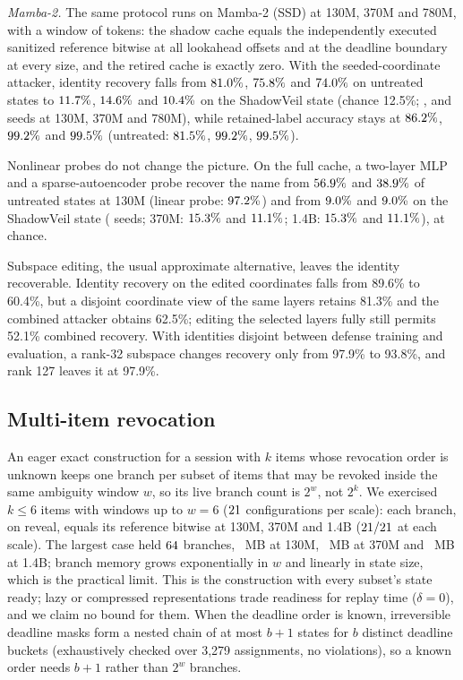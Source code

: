 \documentclass[conference]{IEEEtran}
\begin{document}
\emph{Mamba-2.} The same protocol runs on Mamba-2 (SSD) at 130M, 370M and 780M, with a window of \nMtwoWindowA{} tokens: the shadow cache
equals the independently executed sanitized reference bitwise at all \nMtwoDeltasA{} lookahead offsets and at the deadline boundary at every
size, and the retired cache is exactly zero. With the seeded-coordinate attacker, identity recovery falls from $81.0\%$,
$75.8\%$ and $74.0\%$ on untreated states to $11.7\%$, $14.6\%$ and $10.4\%$ on
the ShadowVeil state (chance 12.5\%; \nMtwoSeedsA, \nMtwoSeedsB{} and \nMtwoSeedsD{} seeds at 130M, 370M and 780M), while retained-label
accuracy stays at $86.2\%$, $99.2\%$ and $99.5\%$ (untreated: $81.5\%$, $99.2\%$, $99.5\%$).

Nonlinear probes do not change the picture. On the full cache, a two-layer MLP and a sparse-autoencoder probe recover the name from $56.9\%$ and $38.9\%$ of untreated states at 130M (linear probe: $97.2\%$) and from $9.0\%$ and $9.0\%$ on the ShadowVeil state (\nStrongSeedsA{} seeds; 370M: $15.3\%$ and $11.1\%$; 1.4B: $15.3\%$ and $11.1\%$), at chance.

Subspace editing, the usual approximate alternative, leaves the identity recoverable. Identity recovery on the edited coordinates falls from 89.6\% to 60.4\%,
but a disjoint coordinate view of the same layers retains 81.3\% and the combined attacker obtains 62.5\%; editing the selected
layers fully still permits 52.1\% combined recovery. With identities disjoint between defense training and evaluation, a rank-32
subspace changes recovery only from 97.9\% to 93.8\%, and rank 127 leaves it at 97.9\%.

\subsection{Multi-item revocation}\label{sec:multi}
An eager exact construction for a session with $k$ items whose revocation order is unknown keeps one branch per subset of items that may be revoked
inside the same ambiguity window $w$, so its live branch count is $2^w$, not $2^k$. We exercised $k\le6$ items with windows up to
$w=6$ ($21$ configurations per scale): each branch, on reveal, equals its reference bitwise at 130M, 370M and 1.4B
($21/21$ at each scale). The largest case held $64$ branches, \nMultiMaxMBA~MB at 130M,
\nMultiMaxMBB~MB at 370M and \nMultiMaxMBC~MB at 1.4B; branch memory grows exponentially in $w$ and linearly in state size, which is the
practical limit. This is the construction with every subset's state ready; lazy or compressed representations trade readiness for replay time ($\delta{=}0$), and we claim no bound for them. When the deadline order is known, irreversible deadline masks form a nested chain of at most $b+1$ states for $b$
distinct deadline buckets (exhaustively checked over 3,279 assignments, no violations), so a known order needs $b+1$ rather than
$2^w$ branches.
\end{document}
